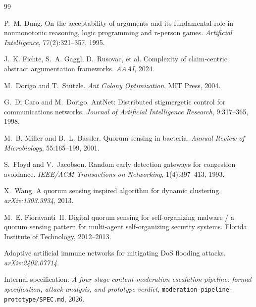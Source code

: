 \documentclass[11pt]{article}
\begin{document}
\begin{thebibliography}{99}

 P.~M. Dung. On the acceptability of arguments and its fundamental
role in nonmonotonic reasoning, logic programming and n-person games.
\emph{Artificial Intelligence}, 77(2):321--357, 1995.

 J.~K. Fichte, S.~A. Gaggl, D.~Rusovac, et al. Complexity of
claim-centric abstract argumentation frameworks. \emph{AAAI}, 2024.

 M.~Dorigo and T.~St\"utzle. \emph{Ant Colony Optimization}.
MIT Press, 2004.

 G.~Di Caro and M.~Dorigo. AntNet: Distributed stigmergetic
control for communications networks. \emph{Journal of Artificial Intelligence
Research}, 9:317--365, 1998.

 M.~B. Miller and B.~L. Bassler. Quorum sensing in bacteria.
\emph{Annual Review of Microbiology}, 55:165--199, 2001.

 S.~Floyd and V.~Jacobson. Random early detection gateways for
congestion avoidance. \emph{IEEE/ACM Transactions on Networking}, 1(4):397--413,
1993.

 X.~Wang. A quorum sensing inspired algorithm for dynamic
clustering. \emph{arXiv:1303.3934}, 2013.

 M.~E. Fioravanti~II. Digital quorum sensing for
self-organizing malware / a quorum sensing pattern for multi-agent self-organizing
security systems. Florida Institute of Technology, 2012--2013.

 Adaptive artificial immune networks for mitigating DoS
flooding attacks. \emph{arXiv:2402.07714}.

 Internal specification: \emph{A four-stage content-moderation
escalation pipeline: formal specification, attack analysis, and prototype verdict},
\texttt{moderation-pipeline-prototype/SPEC.md}, 2026.

\end{thebibliography}
\end{document}

